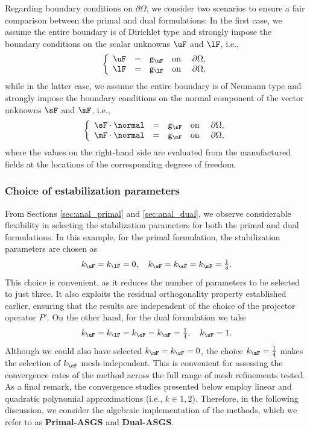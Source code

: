 Regarding boundary conditions on $\partial \Omega$, we consider two scenarios to ensure a fair comparison between the primal and dual formulations:
In the first case, we assume the entire boundary is of Dirichlet type and strongly impose the boundary conditions on the scalar unknowns $\uF$ and $\lF$, i.e.,\begin{equation}
	\left\lbrace
	\begin{array}{rclll}
		\uF &=& \mathsf{g}_{\uF} &\mbox{on}&~\partial \Omega, \\
		\lF &=& \mathsf{g}_{\lF} &\mbox{on}&~\partial \Omega, \\
	\end{array}
	\right.
\end{equation}
while in the latter case, we assume the entire boundary is of Neumann type and strongly impose the boundary conditions on the normal component of the vector unknowns $\sF$ and $\mF$, i.e.,
\begin{equation}
	\left\lbrace
	\begin{array}{rclll}
		\sF \cdot \normal  &=& \mathsf{g}_{\sF} &\mbox{on}&~\partial \Omega, \\
		\mF \cdot \normal &=& \mathsf{g}_{\mF} &\mbox{on}&~\partial \Omega, \\
	\end{array}
	\right.
\end{equation}
where the values on the right-hand side are evaluated  from the manufactured fields
at the locations of the corresponding degrees of freedom.

\subsubsection*{Choice of estabilization parameters}

From Sections \ref{sec:anal_primal} and \ref{sec:anal_dual}, we observe considerable flexibility in selecting the stabilization parameters for both the primal and dual formulations. 
In this example, for the primal formulation, the stabilization parameters are chosen as
$$
k_{\uF} = k_{\lF} = 0, 
\quad 
k_{\eF} = k_{\sF} = k_{\mF} = \tfrac{1}{8}.
$$
This choice is convenient, as it reduces the number of parameters to be selected to just three. It also exploits the residual orthogonality property established earlier, ensuring that the results are independent of the choice of the projector operator $P'$.
On the other hand, for the dual formulation we take
$$
k_{\uF} = k_{\lF} = k_{\eF} = k_{\mF} = \tfrac{1}{4}, 
\quad 
k_{\sF} = 1.
$$
Although we could also have selected $k_{\mF} = k_{\sF} = 0$, the choice $k_{\mF} = \tfrac{1}{4}$ makes the selection of $k_{\eF}$ mesh-independent. This is convenient for assessing the convergence rates of the method across the full range of mesh refinements tested.
As a final remark, the convergence studies presented below employ linear and quadratic polynomial approximations (i.e., $k \in {1,2}$).
Therefore, in the following discussion, we consider the algebraic implementation of the methods, which we refer to as \textbf{Primal-ASGS} and \textbf{Dual-ASGS}.

